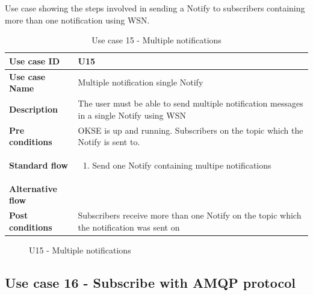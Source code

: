 Use case showing the steps involved in sending a Notify to subscribers containing more than one notification using WSN. 

\begin{table}[ht!]
\centering
\begin{tabular}{|l|p{5cm}|}
\hline
\textbf{Use case ID} & U15 \\ \hline
\textbf{Use case Name} & Multiple notification single Notify\\ \hline
\textbf{Description} & The user must be able to send multiple notification messages in a single Notify using WSN\\ \hline
\textbf{Pre conditions} & OKSE is up and running. Subscribers on the topic which the Notify is sent to. \\ \hline
\textbf{Standard flow} & \begin{enumerate}
\item Send one Notify containing multipe notifications
\end{enumerate} \\ \hline
\textbf{Alternative flow} & \\ \hline
\textbf{Post conditions} & Subscribers receive more than one Notify on the topic which the notification was sent on\\ \hline
\end{tabular}
\caption{Use case 15 - Multiple notifications}
\label{uc15}
\end{table}

\begin{center}
  \begin{figure}[ht!]
    \caption{U15 - Multiple notifications}
    \label{fig:u15}
  \end{figure}
\end{center}

\clearpage

\subsection{Use case 16 - Subscribe with AMQP protocol}
\label{subsec:requirements_engineering-use_cases-sub_amqp}

